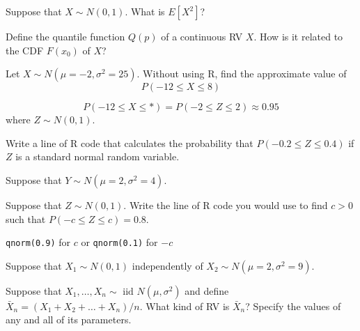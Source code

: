 \documentclass[addpoints,12pt]{exam}
\begin{document}
\begin{questions}
\question Suppose that $X \sim N(0,1)$. What is $E[X^2]$?

\question Define the quantile function $Q(p)$ of a continuous RV $X$. How is it related to the CDF $F(x_0)$ of $X$?

\question Let $X \sim N(\mu = -2, \sigma^2 = 25)$. 
Without using R, find the approximate value of
\[P(-12 \leq X \leq 8)\] 
\begin{solution}
\[
  P(-12 \leq X \leq *) = P(-2 \leq Z \leq 2) \approx 0.95
\]
where $Z \sim N(0,1)$.
\end{solution}

\question Write a line of R code that calculates the probability that $P(-0.2 \leq Z \leq 0.4)$ if $Z$ is a standard normal random variable.

\question Suppose that $Y \sim N(\mu = 2, \sigma^2 = 4)$. 

\question Suppose that $Z \sim N(0,1)$. Write the line of R code you would use to find $c>0$ such that $P(-c \leq Z \leq c) = 0.8$.
\begin{solution}
  \texttt{qnorm(0.9)} for $c$ or \texttt{qnorm(0.1)} for $-c$
\end{solution}


\question Suppose that $X_1 \sim N(0,1)$ independently of $X_2 \sim N(\mu = 2, \sigma^2 = 9)$.

\question Suppose that $X_1, \dots, X_n \sim \text{ iid } N(\mu, \sigma^2)$ and define $\bar{X}_n = (X_1 + X_2 + \dots + X_n) / n$.
What kind of RV is $\bar{X}_n$?
Specify the values of any and all of its parameters.



\end{questions}
\end{document}

